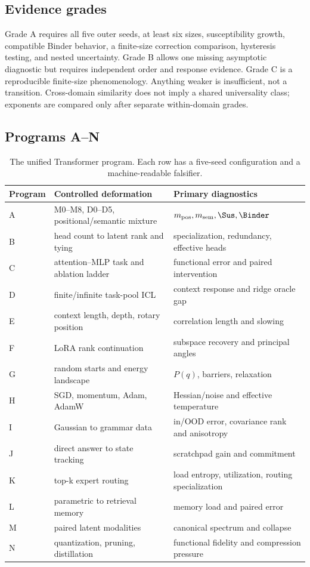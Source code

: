 \subsection{Evidence grades}

Grade A requires all five outer seeds, at least six sizes, susceptibility growth, compatible
Binder behavior, a finite-size correction comparison, hysteresis testing, and nested
uncertainty. Grade B allows one missing asymptotic diagnostic but requires independent
order and response evidence. Grade C is a reproducible finite-size phenomenology. Anything
weaker is insufficient, not a transition. Cross-domain similarity does not imply a shared
universality class; exponents are compared only after separate within-domain grades.

\subsection{Programs A--N}

\begin{table}[t]
\centering
\small
\begin{tabularx}{\linewidth}{@{}lYY@{}}
\toprule
Program & Controlled deformation & Primary diagnostics \\
\midrule
A & M0--M8, D0--D5, positional/semantic mixture & \(m_{\rm pos},m_{\rm sem},\Sus,\Binder\) \\
B & head count to latent rank and tying & specialization, redundancy, effective heads \\
C & attention--MLP task and ablation ladder & functional error and paired intervention \\
D & finite/infinite task-pool ICL & context response and ridge oracle gap \\
E & context length, depth, rotary position & correlation length and slowing \\
F & LoRA rank continuation & subspace recovery and principal angles \\
G & random starts and energy landscape & \(P(q)\), barriers, relaxation \\
H & SGD, momentum, Adam, AdamW & Hessian/noise and effective temperature \\
I & Gaussian to grammar data & in/OOD error, covariance rank and anisotropy \\
J & direct answer to state tracking & scratchpad gain and commitment \\
K & top-k expert routing & load entropy, utilization, routing specialization \\
L & parametric to retrieval memory & memory load and paired error \\
M & paired latent modalities & canonical spectrum and collapse \\
N & quantization, pruning, distillation & functional fidelity and compression pressure \\
\bottomrule
\end{tabularx}
\caption{The unified Transformer program. Each row has a five-seed configuration and a
machine-readable falsifier.}
\end{table}

